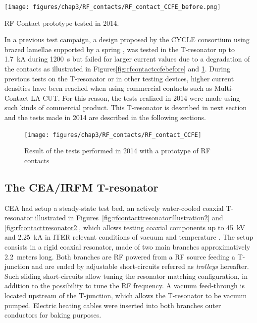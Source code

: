 {\begin{marginfigure}
	\centering
	\texttt{[image: figures/chap3/RF\_contacts/RF\_contact\_CCFE\_before.png]}
	\caption{RF Contact prototype tested in 2014.}
	\label{fig:rfcontactccfebefore}
\end{marginfigure}

In a previous test campaign, a design proposed by the CYCLE consortium using brazed lamellae supported by a spring , was tested in the T-resonator up to 1.7~kA during 1200~s but failed for larger current values due to a degradation of the contacts as illustrated in Figures\ref{fig:rfcontactccfebefore} and \ref{fig:rfcontactccfe}. During previous tests on the T-resonator or in other testing devices, higher current densities have been reached when using commercial contacts such as Multi-Contact LA-CUT. For this reason, the tests realized in 2014 were made using such kinds of commercial product. This T-resonator is described in next section and the tests made in 2014 are described in the following sections.

\begin{figure}
	\centering
	\texttt{[image: figures/chap3/RF\_contacts/RF\_contact\_CCFE]}
	\caption{Result of the tests performed in 2014 with a prototype of RF contacts}
	\label{fig:rfcontactccfe}
\end{figure}

\subsection{The CEA/IRFM T-resonator}
CEA had setup a steady-state test bed, an actively water-cooled coaxial T-resonator illustrated in Figures~\ref{fig:rfcontacttresonatorillustration2} and \ref{fig:rfcontacttresonator2}, which allows testing coaxial components up to 45~kV and 2.25~kA in ITER relevant conditions of vacuum and temperature . The setup consists in a rigid coaxial resonator, made of two main branches approximatively 2.2~meters long. Both branches are RF powered from a RF source feeding a T-junction and are ended by adjustable short-circuits referred as \textit{trolleys} hereafter. Such sliding short-circuits allow tuning the resonator matching configuration, in addition to the possibility to tune the RF frequency. A vacuum feed-through is located upstream of the T-junction, which allows the T-resonator to be vacuum pumped. Electric heating cables were inserted into both branches outer conductors for baking purposes. 

}
